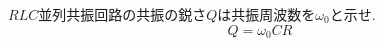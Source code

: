 \begin{problem}
$RLC$並列共振回路の共振の鋭さ$Q$は共振周波数を$\omega_0$と示せ.
$$Q = \omega_0CR$$
\end{problem}
\begin{solve}
\end{solve}
